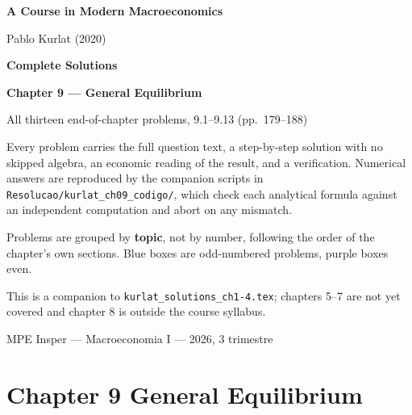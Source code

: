 \documentclass[12pt, letterpaper]{article}
\begin{document}
\begin{titlepage}
\centering
\vspace*{2.5cm}
{\Huge\bfseries\color{darkblue} A Course in Modern Macroeconomics\par}
\vspace{6pt}
{\large Pablo Kurlat (2020)\par}
\vspace{1.4cm}
{\LARGE\bfseries Complete Solutions\par}
\vspace{6pt}
{\LARGE\bfseries Chapter 9 --- General Equilibrium\par}
\vspace{1.2cm}
{\large All thirteen end-of-chapter problems, 9.1--9.13 (pp.~179--188)\par}
\vspace{2cm}

\begin{tcolorbox}[theorybox,title={What is in this file},width=0.86\textwidth]
\small
Every problem carries the full question text, a step-by-step solution with no skipped
algebra, an economic reading of the result, and a verification. Numerical answers are
reproduced by the companion scripts in \texttt{Resolucao/kurlat\_ch09\_codigo/}, which
check each analytical formula against an independent computation and abort on any
mismatch.

\smallskip
Problems are grouped by \textbf{topic}, not by number, following the order of the
chapter's own sections. Blue boxes are odd-numbered problems, purple boxes even.

\smallskip
This is a companion to \texttt{kurlat\_solutions\_ch1-4.tex}; chapters 5--7 are not yet
covered and chapter 8 is outside the course syllabus.
\end{tcolorbox}

\vfill
{\small MPE Insper --- Macroeconomia I --- 2026, 3\textordmasculine{} trimestre\par}
\end{titlepage}

\tableofcontents
\newpage

\section{Chapter 9 \quad General Equilibrium}
\end{document}
